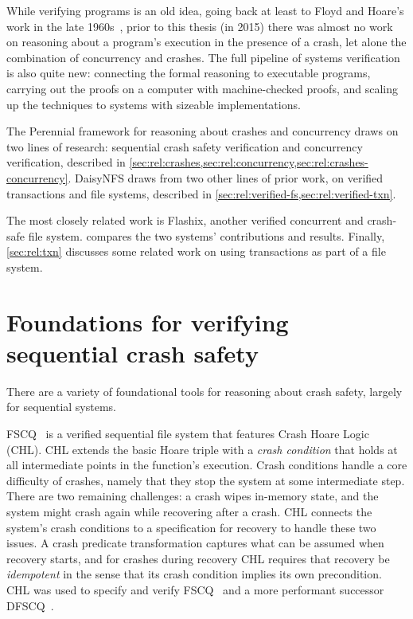 While verifying programs is an old idea, going back at least to Floyd and
Hoare's work in the late 1960s~\cite{floyd:meanings,hoare:logic}, prior to this
thesis (in 2015) there was almost no work on reasoning about a program's
execution in the presence of a crash, let alone the combination of concurrency
and crashes. The full pipeline of systems verification is also quite new:
connecting the formal reasoning to executable programs, carrying out the proofs
on a computer with machine-checked proofs, and scaling up the techniques to
systems with sizeable implementations.

The Perennial framework for reasoning about crashes and concurrency draws on two
lines of research: sequential crash safety verification and concurrency
verification, described in
\cref{sec:rel:crashes,sec:rel:concurrency,sec:rel:crashes-concurrency}. DaisyNFS
draws from two other lines of prior work, on verified transactions and file
systems, described in \cref{sec:rel:verified-fs,sec:rel:verified-txn}.

The most closely related work is Flashix, another verified concurrent and
crash-safe file system.  compares the two systems'
contributions and results. Finally, \cref{sec:rel:txn} discusses some related work
on using transactions as part of a file system.


\section{Foundations for verifying sequential crash safety}
\label{sec:rel:crashes}

There are a variety of foundational tools for reasoning about crash safety,
largely for sequential systems.

FSCQ~\cite{chen:fscq,chen:dfscq,hchen-phd} is a verified sequential file
system that features Crash Hoare Logic (CHL). CHL extends the basic Hoare triple
with a \emph{crash condition} that holds at all intermediate points in the
function's execution. Crash conditions handle a core difficulty of crashes,
namely that they stop the system at some intermediate step. There are two
remaining challenges: a crash wipes in-memory state, and the system might crash again
while recovering after a crash. CHL connects the system's crash conditions to a
specification for recovery to handle these two issues. A crash predicate
transformation captures what can be assumed when recovery starts, and for
crashes during recovery CHL requires that recovery be \emph{idempotent} in the
sense that its crash condition implies its own precondition. CHL was used to
specify and verify FSCQ~\cite{chen:fscq} and a more performant successor
DFSCQ~\cite{chen:dfscq}.

